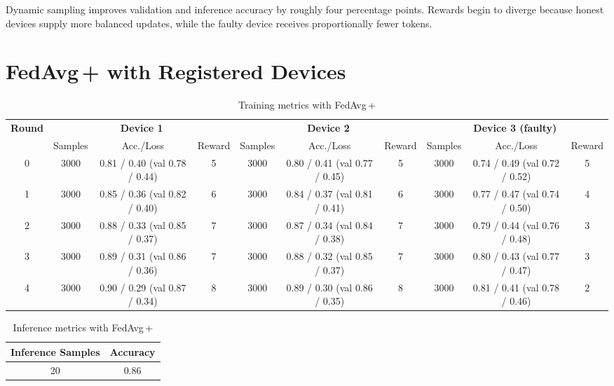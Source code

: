 Dynamic sampling improves validation and inference accuracy by roughly four percentage points. Rewards begin to diverge because honest devices supply more balanced updates, while the faulty device receives proportionally fewer tokens.

\section{FedAvg\,+ with Registered Devices}

\begin{table}[h!]
    \centering
    \caption{Training metrics with FedAvg\,+}
    \label{tab:fedavg_plus}
    \begin{tabular}{c|ccc|ccc|ccc}
        \toprule
        \multirow{2}{*}{\textbf{Round}} & \multicolumn{3}{c|}{\textbf{Device 1}} & \multicolumn{3}{c|}{\textbf{Device 2}} & \multicolumn{3}{c}{\textbf{Device 3 (faulty)}} \\
        & Samples & Acc./Loss & Reward & Samples & Acc./Loss & Reward & Samples & Acc./Loss & Reward \\
        \midrule
        0 & 3000 & 0.81 / 0.40 (val 0.78 / 0.44) & 5 & 3000 & 0.80 / 0.41 (val 0.77 / 0.45) & 5 & 3000 & 0.74 / 0.49 (val 0.72 / 0.52) & 5 \\
        1 & 3000 & 0.85 / 0.36 (val 0.82 / 0.40) & 6 & 3000 & 0.84 / 0.37 (val 0.81 / 0.41) & 6 & 3000 & 0.77 / 0.47 (val 0.74 / 0.50) & 4 \\
        2 & 3000 & 0.88 / 0.33 (val 0.85 / 0.37) & 7 & 3000 & 0.87 / 0.34 (val 0.84 / 0.38) & 7 & 3000 & 0.79 / 0.44 (val 0.76 / 0.48) & 3 \\
        3 & 3000 & 0.89 / 0.31 (val 0.86 / 0.36) & 7 & 3000 & 0.88 / 0.32 (val 0.85 / 0.37) & 7 & 3000 & 0.80 / 0.43 (val 0.77 / 0.47) & 3 \\
        4 & 3000 & 0.90 / 0.29 (val 0.87 / 0.34) & 8 & 3000 & 0.89 / 0.30 (val 0.86 / 0.35) & 8 & 3000 & 0.81 / 0.41 (val 0.78 / 0.46) & 2 \\
        \bottomrule
    \end{tabular}
\end{table}

\begin{table}[h!]
    \centering
    \caption{Inference metrics with FedAvg\,+}
    \label{tab:fedavg_plus_inference}
    \begin{tabular}{c c}
        \toprule
        \textbf{Inference Samples} & \textbf{Accuracy} \\
        \midrule
        20 & 0.86 \\
        \bottomrule
    \end{tabular}
\end{table}

